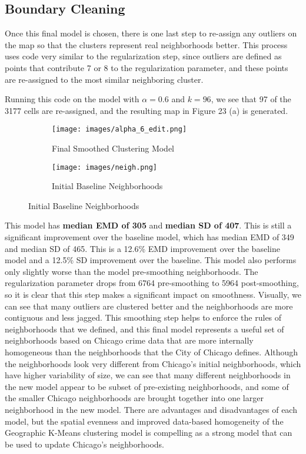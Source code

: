 \documentclass[times new roman,12pt]{article}
\begin{document}
\subsection{Boundary Cleaning}

Once this final model is chosen, there is one last step to re-assign any outliers on the map so that the clusters represent real neighborhoods better. This process uses code very similar to the regularization step, since outliers are defined as points that contribute 7 or 8 to the regularization parameter, and these points are re-assigned to the most similar neighboring cluster. 

Running this code on the model with $\alpha = 0.6$ and $k=96$, we see that 97 of the 3177 cells are re-assigned, and the resulting map in Figure 23 (a) is generated. 

\begin{figure}[H]
\centering
\caption{Final Model Compared to Baseline Model}
\begin{subfigure}[t]{.5\textwidth}
\centering
  \texttt{[image: images/alpha\_6\_edit.png]}
  \caption{Final Smoothed Clustering Model}
  \label{fig:alpha_6_edit}
\end{subfigure}%
\begin{subfigure}[t]{.5\textwidth}
\centering
  \texttt{[image: images/neigh.png]}
  \caption{Initial Baseline Neighborhoods}
  \label{fig:baseline}
\end{subfigure}%
\end{figure}


This model has \textbf{median EMD of 305} and \textbf{median SD of 407}. This is still a significant improvement over the baseline model, which has median EMD of 349 and median SD of 465. This is a 12.6\% EMD improvement over the baseline model and a 12.5\% SD improvement over the baseline. This model also performs only slightly worse than the model pre-smoothing neighborhoods. The regularization parameter drops from 6764 pre-smoothing to 5964 post-smoothing, so it is clear that this step makes a significant impact on smoothness. Visually, we can see that many outliers are clustered better and the neighborhoods are more contiguous and less jagged. This smoothing step helps to enforce the rules of neighborhoods that we defined, and this final model represents a useful set of neighborhoods based on Chicago crime data that are more internally homogeneous than the neighborhoods that the City of Chicago defines. Although the neighborhoods look very different from Chicago's initial neighborhoods, which have higher variability of size, we can see that many different neighborhoods in the new model appear to be subset of pre-existing neighborhoods, and some of the smaller Chicago neighborhoods are brought together into one larger neighborhood in the new model. There are advantages and disadvantages of each model, but the spatial evenness and improved data-based homogeneity of the Geographic K-Means clustering model is compelling as a strong model that can be used to update Chicago's neighborhoods.  
\end{document}
